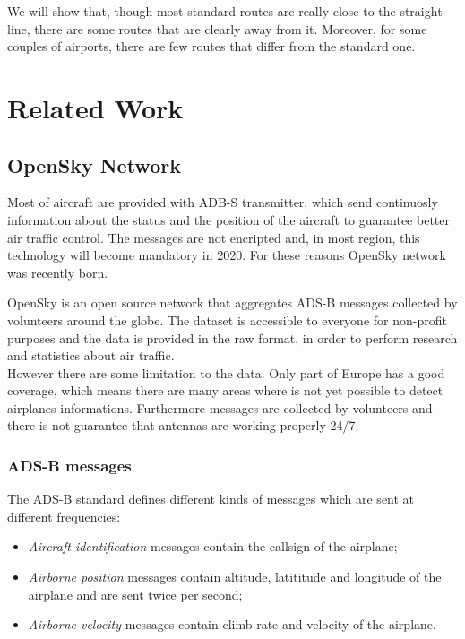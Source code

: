 \documentclass{vldb}
\begin{document}
We will show that, though most standard routes are really close to the straight line, there are some routes that are clearly away from it. Moreover, for some couples of airports, there are few routes that differ from the standard one.

\section{Related Work}

\subsection{OpenSky Network}

Most of aircraft are provided with ADB-S transmitter, which send continuosly information about the status and the position of the aircraft to guarantee better air traffic control. The messages are not encripted and, in most region, this technology will become mandatory in 2020. For these reasons OpenSky network was recently born.

OpenSky is an open source network that aggregates ADS-B messages collected by volunteers around the globe. The dataset is accessible to everyone for non-profit purposes and the data is provided in the raw format, in order to perform research and statistics about air traffic. \\
However there are some limitation to the data. Only part of Europe has a good coverage, which means there are many areas where is not yet possible to detect airplanes informations. Furthermore messages are collected by volunteers and there is not guarantee that antennas are working properly 24/7.

    \subsubsection{ADS-B messages}

    The ADS-B standard defines different kinds of messages which are sent at different frequencies:

    \begin{itemize}
        \item \textit{Aircraft identification} messages contain the callsign of the airplane;
        \item \textit{Airborne position} messages contain altitude, latititude and longitude of the airplane and are sent twice per second;
        \item \textit{Airborne velocity} messages contain climb rate and velocity of the airplane.
    \end{itemize}
\end{document}
